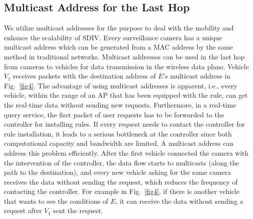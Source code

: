\documentclass[journal]{IEEEtran}
\begin{document}
%




\subsection{Multicast Address for the Last Hop} \label{Multicast address}



We utilize multicast addresses for the purpose to deal with the mobility and enhance the scalability of SDIV. Every surveillance camera has a unique multicast address which can be generated from a MAC address by the same method in traditional networks. Multicast addresses can be used in the last hop from cameras to vehicles for data transmission in the wireless data plane. Vehicle $V_{1}$ receives packets with the destination address of $E$'s multicast address in Fig.~\ref{fig4}. The advantage of using multicast addresses is apparent, i.e., every vehicle, within the range of an AP that has been equipped with the rule, can get the real-time data without sending new requests. Furthermore, in a real-time query service, the first packet of user requests has to be forwarded to the controller for installing rules. If every request needs to contact the controller for rule installation, it leads to a serious bottleneck at the controller since both computational capacity and bandwidth are limited. A multicast address can address this problem efficiently. After the first vehicle connected the camera with the intervention of the controller, the data flow starts to multicasts (along the path to the destination), and every new vehicle asking for the same camera receives the data without sending the request, which reduces the frequency of contacting the controller. For example in Fig.~\ref{fig4}, if there is another vehicle that wants to see the conditions of $E$, it can receive the data without sending a request after $V_{1}$ sent the request.
\end{document}
